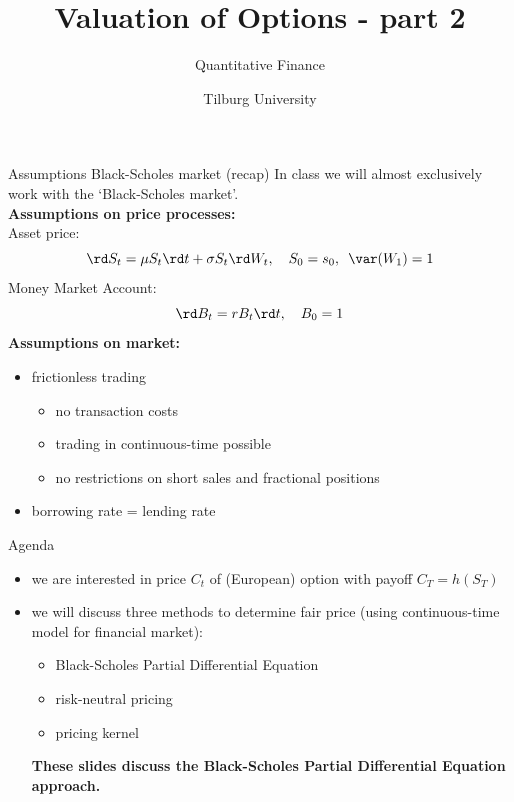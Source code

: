 \documentclass[pdf, handout]{beamer}
\title{Valuation of Options - part 2}
\subtitle{Quantitative Finance}
\author{Tilburg University}
\institute{Ramon van den Akker}
\date{}
\begin{document}
\begin{frame}
\titlepage
\end{frame}

\begin{frame}{Assumptions  Black-Scholes market (recap)}
In class we will almost exclusively work with the `Black-Scholes market'.
\\ \vspace{.5cm}
\textbf{Assumptions on price processes:} \\
Asset price:
\[
\rd S_t=\mu S_t \rd t + \sigma S_t \rd W_t,\quad S_0=s_0,\,\,\, \var(W_1) = 1
\]
Money Market Account:
\[
\rd B_t= r B_t \rd t,\quad B_0=1
\]
\textbf{Assumptions on market:} \\
\begin{itemize}
\item frictionless trading
\begin{itemize}
\item no transaction costs
\item trading in continuous-time possible
\item no restrictions on short sales and fractional positions
\end{itemize}
\item borrowing rate = lending rate
\end{itemize}
\end{frame}
%

\begin{frame}{Agenda}
\begin{itemize}
\item we are interested in  price $C_t$ of (European) option with payoff $C_T=h(S_T)$
\item we will discuss three methods to determine fair price (using continuous-time model for financial market):
\begin{itemize}
\item Black-Scholes Partial Differential Equation
\item risk-neutral pricing
\item pricing kernel
\end{itemize}
\textbf{These slides discuss the Black-Scholes Partial Differential Equation approach.}
\end{itemize}
\end{frame}
\end{document}
